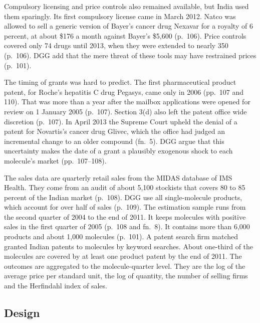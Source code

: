 Compulsory licensing and price controls also remained available, but India used them sparingly. Its first compulsory
license came in March 2012. Natco was allowed to sell a generic version of Bayer's cancer drug Nexavar for a royalty of
6 percent, at about \$176 a month against Bayer's \$5,600 (p.~106). Price controls covered only 74 drugs until 2013,
when they were extended to nearly 350 (p.~106). DGG add that the mere threat of these tools may have restrained prices
(p.~101).

The timing of grants was hard to predict. The first pharmaceutical product patent, for Roche's hepatitis C drug
Pegasys, came only in 2006 (pp.~107 and 110). That was more than a year after the mailbox applications were opened for review
on 1 January 2005 (p.~107). Section 3(d) also left the patent office wide discretion (p.~107). In April 2013 the Supreme Court
upheld the denial of a patent for Novartis's cancer drug Glivec, which the office had judged an incremental change to
an older compound (fn.~5). DGG argue that this uncertainty makes the date of a grant a plausibly exogenous shock to
each molecule's market (pp.~107--108).

The sales data are quarterly retail sales from the MIDAS database of IMS Health. They come from an audit of about
5,100 stockists that covers 80 to 85 percent of the Indian market (p.~108). DGG use all single-molecule products,
which account for over half of sales (p.~109). The estimation sample runs from the second quarter of 2004 to the end
of 2011. It keeps molecules with positive sales in the first quarter of 2005 (p.~108 and fn.~8). It contains more
than 6,000 products and about 1,000 molecules (p.~101). A patent search firm matched granted Indian patents to
molecules by keyword searches. About one-third of the molecules are covered by at least one product patent by the end
of 2011. The outcomes are aggregated to the molecule-quarter level. They are the log of the average price per
standard unit, the log of quantity, the number of selling firms and the Herfindahl index of sales.

\subsection{Design}\label{sec:05-dgg-design}

